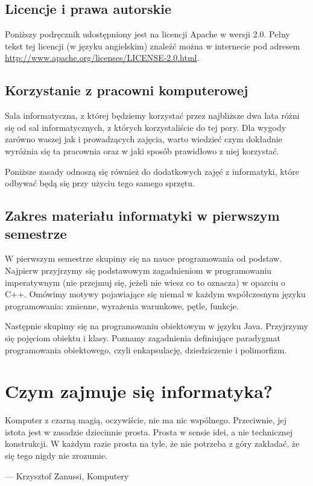 \documentclass[11pt]{book}
\begin{document}
\section{Licencje i prawa autorskie}
Poniższy podręcznik udostępniony jest na licencji Apache w wersji 2.0.
Pełny tekst tej licencji (w języku angielskim) znaleźć można w internecie
pod adresem \url{http://www.apache.org/licenses/LICENSE-2.0.html}.

\section{Korzystanie z pracowni komputerowej}
Sala informatyczna, z której będziemy korzystać przez najbliższe dwa lata
różni się od sal informatycznych, z których korzystaliście do tej pory.
Dla wygody zarówno waszej jak i prowadzących zajęcia, warto wiedzieć czym
dokładnie wyróżnia się ta pracownia oraz w jaki sposób prawidłowo z niej
korzystać.

Poniższe zasady odnoszą się również do dodatkowych zajęć z informatyki, które
odbywać będą się przy użyciu tego samego sprzętu.

\section{Zakres materiału informatyki w pierwszym semestrze}
W pierwszym semestrze skupimy się na nauce programowania od podstaw. Najpierw 
przyjrzymy się podstawowym zagadnieniom w programowaniu imperatywnym (nie 
przejmuj się, jeżeli nie wiesz co to oznacza) w oparciu o C++. Omówimy motywy
pojawiające się niemal w każdym współczesnym języku programowania: zmienne,
wyrażenia warunkowe, pętle, funkcje.

Następnie skupimy się na programowaniu obiektowym w języku Java. Przyjrzymy
się pojęciom obiektu i klasy. Poznamy zagadnienia definiujące paradygmat
programowania obiektowego, czyli enkapsulację, dziedziczenie i polimorfizm.

\chapter{Czym zajmuje się informatyka?}
\epigraph%
{Komputer z czarną magią, oczywiście, nie ma nic wspólnego. Przeciwnie, jej
istota jest w zasadzie dziecinnie prosta. Prosta w sensie idei, a nie
technicznej konstrukcji. W każdym razie prosta na tyle, że nie potrzeba z góry
zakładać, że się tego nigdy nie zrozumie.}%
{--- \textup{Krzysztof Zanussi}, Komputery}
\end{document}
